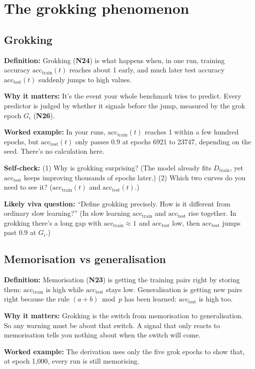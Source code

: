 \documentclass[11pt,a4paper,oneside,openany]{report}
\newcommand{\acctest}{\mathrm{acc}_{\mathrm{test}}}
\newcommand{\acctrain}{\mathrm{acc}_{\mathrm{train}}}
\newcommand{\Dtrain}{D_{\mathrm{train}}}
\newcommand{\gl}[1]{\textbf{#1}}   %
\newcommand{\fdef}{\textbf{Definition:} }
\newcommand{\fwhy}{\par\textbf{Why it matters:} }
\newcommand{\fex}{\par\textbf{Worked example:} }
\newcommand{\fself}{\par\textbf{Self-check:} }
\newcommand{\fviva}{\par\textbf{Likely viva question:} }
\begin{document}
\chapter{The grokking phenomenon}

\section{Grokking}
\fdef Grokking (\gl{N24}) is what happens when, in one run, training accuracy $\acctrain(t)$ reaches about 1 early, and much later test accuracy $\acctest(t)$ suddenly jumps to high values.
\fwhy It's the event your whole benchmark tries to predict. Every predictor is judged by whether it signals before the jump, measured by the grok epoch $G_i$ (\gl{N26}).
\fex In your runs, $\acctrain(t)$ reaches 1 within a few hundred epochs, but $\acctest(t)$ only passes 0.9 at epochs 6921 to 23747, depending on the seed. There's no calculation here.
\fself (1) Why is grokking surprising? (The model already fits $\Dtrain$, yet $\acctest$ keeps improving thousands of epochs later.) (2) Which two curves do you need to see it? ($\acctrain(t)$ and $\acctest(t)$.)
\fviva ``Define grokking precisely. How is it different from ordinary slow learning?'' (In slow learning $\acctrain$ and $\acctest$ rise together. In grokking there's a long gap with $\acctrain \approx 1$ and $\acctest$ low, then $\acctest$ jumps past 0.9 at $G_i$.)

\section{Memorisation vs generalisation}
\fdef Memorisation (\gl{N23}) is getting the training pairs right by storing them: $\acctrain$ is high while $\acctest$ stays low. Generalisation is getting new pairs right because the rule $(a+b) \bmod p$ has been learned: $\acctest$ is high too.
\fwhy Grokking is the switch from memorisation to generalisation. So any warning must be about that switch. A signal that only reacts to memorisation tells you nothing about when the switch will come.
\fex The derivation uses only the five grok epochs to show that, at epoch 1{,}000, every run is still memorising.
\end{document}
